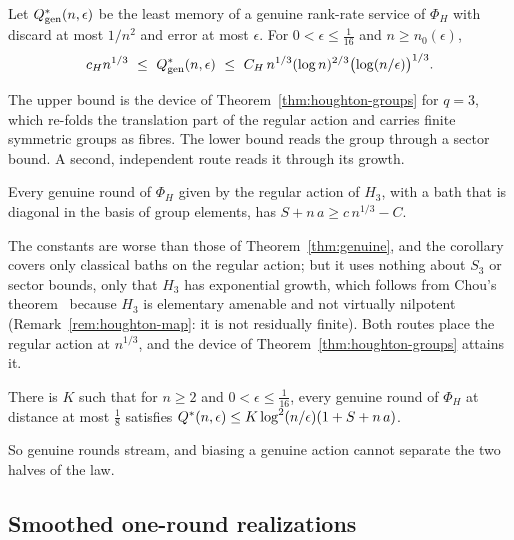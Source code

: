 \begin{theorem}\label{thm:houghton-genuine}
Let $Q^{*}_{\rm gen}(n,\epsilon)$ be the least memory of a genuine rank-rate service of $\Phi_H$ with discard at most $1/n^2$ and error at most $\epsilon$. For
$0<\epsilon\le\frac1{16}$ and $n\ge n_0(\epsilon)$,
\[
c_H n^{1/3}\ \le\ Q^{*}_{\rm gen}(n,\epsilon)\ \le\ C_H\,n^{1/3}(\log n)^{2/3}\bigl(\log(n/\epsilon)\bigr)^{1/3}.
\]
\end{theorem}

The upper bound is the device of Theorem~\ref{thm:houghton-groups} for $q=3$, which re-folds the translation part of the regular action and
carries finite symmetric groups as fibres. The lower bound reads the group through a sector bound. A second, independent route reads it through
its growth.

\begin{corollary}\label{cor:growth-route}
Every genuine round of $\Phi_H$ given by the regular action of $H_3$, with a bath that is diagonal in the basis of group elements, has
$S+n\,a\ge c\,n^{1/3}-C$.
\end{corollary}

The constants are worse than those of Theorem~\ref{thm:genuine}, and the corollary covers only classical baths on the regular action; but it uses
nothing about $S_3$ or sector bounds, only that $H_3$ has exponential growth, which follows from Chou's theorem~\cite[Theorem~3.2]{Chou1980}
because $H_3$ is elementary amenable and not virtually nilpotent (Remark~\ref{rem:houghton-map}: it is not residually finite). Both routes
place the regular action at $n^{1/3}$, and the device of Theorem~\ref{thm:houghton-groups} attains it.

\begin{proposition}\label{prop:genuine-vacuous}
There is $K$ such that for $n\ge2$ and $0<\epsilon\le\frac1{16}$, every genuine round of $\Phi_H$ at distance at most $\frac18$ satisfies
$Q^{*}(n,\epsilon)\le K\log^2(n/\epsilon)(1+S+n\,a)$.
\end{proposition}

So genuine rounds stream, and biasing a genuine action cannot separate the two halves of the law.

\subsection{Smoothed one-round realizations}

